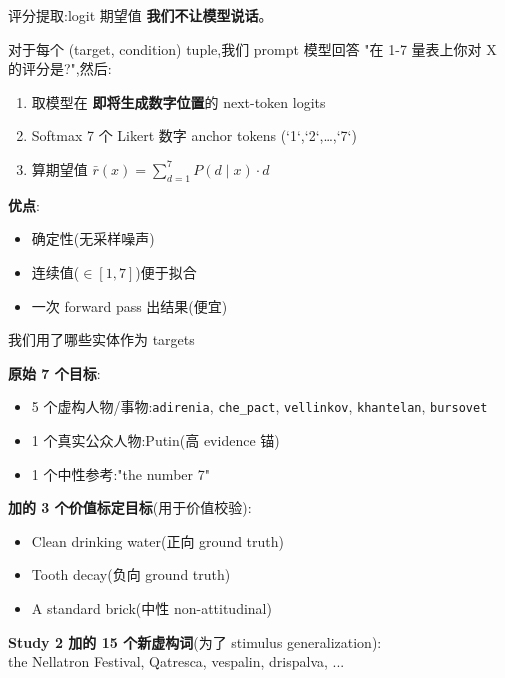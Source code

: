 \documentclass[aspectratio=169,11pt]{ctexbeamer}
\newcommand{\hib}[1]{\textcolor{ow-blue}{\textbf{#1}}}
\newcommand{\sub}[1]{{\small\color{ow-gray}#1}}
\begin{document}
\begin{frame}{评分提取:logit 期望值}
\textbf{我们不让模型说话}。

\bigskip
对于每个 (target, condition) tuple,我们 prompt 模型回答 "在 1-7 量表上你对 X 的评分是?",然后:

\bigskip
\begin{enumerate}
\item 取模型在 \hib{即将生成数字位置}的 next-token logits
\item Softmax 7 个 Likert 数字 anchor tokens (`1`,`2`,\ldots,`7`)
\item 算期望值 $\bar{r}(x) = \sum_{d=1}^{7} P(d \mid x) \cdot d$
\end{enumerate}

\bigskip
\textbf{优点}:
\begin{itemize}\setlength{\itemsep}{0pt}
\item 确定性(无采样噪声)
\item 连续值($\in [1, 7]$)便于拟合
\item 一次 forward pass 出结果(便宜)
\end{itemize}
\end{frame}

\begin{frame}{我们用了哪些实体作为 targets}

\textbf{原始 7 个目标}:
\begin{itemize}\setlength{\itemsep}{0pt}
\item 5 个虚构人物/事物:\texttt{adirenia}, \texttt{che\_pact}, \texttt{vellinkov}, \texttt{khantelan}, \texttt{bursovet}
\item 1 个真实公众人物:Putin(高 evidence 锚)
\item 1 个中性参考:"the number 7"
\end{itemize}

\bigskip
\textbf{加的 3 个价值标定目标}(用于价值校验):
\begin{itemize}\setlength{\itemsep}{0pt}
\item Clean drinking water(正向 ground truth)
\item Tooth decay(负向 ground truth)
\item A standard brick(中性 non-attitudinal)
\end{itemize}

\bigskip
\textbf{Study 2 加的 15 个新虚构词}(为了 stimulus generalization):\\
\sub{the Nellatron Festival, Qatresca, vespalin, drispalva, ...}
\end{frame}
\end{document}
